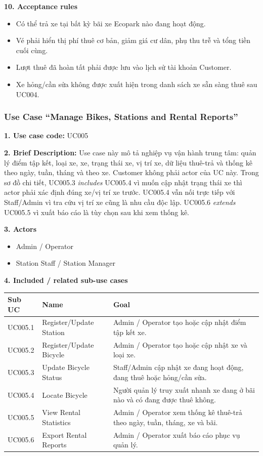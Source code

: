 \textbf{10. Acceptance rules}
\begin{itemize}
  \item Có thể trả xe tại bất kỳ bãi xe Ecopark nào đang hoạt động.
  \item Vé phải hiển thị phí thuê cơ bản, giảm giá cư dân, phụ thu trễ và tổng tiền cuối cùng.
  \item Lượt thuê đã hoàn tất phải được lưu vào lịch sử tài khoản Customer.
  \item Xe hỏng/cần sửa không được xuất hiện trong danh sách xe sẵn sàng thuê sau UC004.
\end{itemize}

\newpage
\subsubsection{Use Case ``Manage Bikes, Stations and Rental Reports''}

\textbf{1. Use case code:} UC005

\textbf{2. Brief Description:} Use case này mô tả nghiệp vụ vận hành trung tâm:
quản lý điểm tập kết, loại xe, xe, trạng thái xe, vị trí xe, dữ liệu thuê-trả và
thống kê theo ngày, tuần, tháng và theo xe. Customer không phải actor của UC này.
Trong sơ đồ chi tiết, UC005.3 \textit{includes} UC005.4 vì muốn cập nhật trạng
thái xe thì actor phải xác định đúng xe/vị trí xe trước. UC005.4 vẫn nối trực
tiếp với Staff/Admin vì tra cứu vị trí xe cũng là nhu cầu độc lập. UC005.6
\textit{extends} UC005.5 vì xuất báo cáo là tùy chọn sau khi xem thống kê.

\textbf{3. Actors}
\begin{itemize}
  \item Admin / Operator
  \item Station Staff / Station Manager
\end{itemize}

\textbf{4. Included / related sub-use cases}
\begin{longtable}{P{0.18\textwidth}P{0.30\textwidth}P{0.42\textwidth}}
\toprule
\textbf{Sub UC} & \textbf{Name} & \textbf{Goal} \\
\midrule
UC005.1 & Register/Update Station & Admin / Operator tạo hoặc cập nhật điểm tập kết xe. \\
UC005.2 & Register/Update Bicycle & Admin / Operator tạo hoặc cập nhật xe và loại xe. \\
UC005.3 & Update Bicycle Status & Staff/Admin cập nhật xe đang hoạt động, đang thuê hoặc hỏng/cần sửa. \\
UC005.4 & Locate Bicycle & Người quản lý truy xuất nhanh xe đang ở bãi nào và có đang được thuê không. \\
UC005.5 & View Rental Statistics & Admin / Operator xem thống kê thuê-trả theo ngày, tuần, tháng, xe và bãi. \\
UC005.6 & Export Rental Reports & Admin / Operator xuất báo cáo phục vụ quản lý. \\
\bottomrule
\end{longtable}

